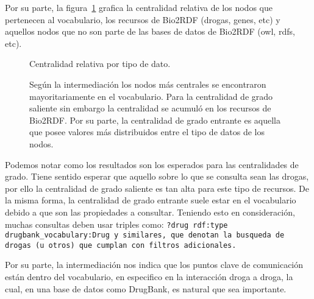 Por su parte, la figura~\ref{fig:comptype} grafica la centralidad relativa de
los nodos que pertenecen al vocabulario, los recursos de Bio2RDF (drogas, genes,
etc) y aquellos nodos que no son parte de las bases de datos de Bio2RDF (owl,
rdfs, etc).
\begin{figure}[h]
  \caption{Centralidad relativa por tipo de dato.}
  \caption*{
    Según la intermediación los nodos más centrales se encontraron
    mayoritariamente en el vocabulario. Para la centralidad de grado
    saliente sin embargo la centralidad se acumuló en los recursos de Bio2RDF.
    Por su parte, la centralidad de grado entrante es aquella que posee valores
    más distribuidos entre el tipo de datos de los nodos.
  }
  \label{fig:comptype}
\end{figure}

Podemos notar como los resultados son los esperados para las centralidades de
grado.
Tiene sentido esperar que aquello sobre lo que se consulta sean las  drogas, por
ello la centralidad de grado saliente es tan alta para este tipo de recursos.
De la misma forma, la centralidad de grado entrante suele estar en el
vocabulario debido a que son las propiedades a consultar.
Teniendo esto en consideración, muchas consultas deben usar triples
como: \tt{?drug rdf:type drugbank\_vocabulary:Drug} y similares, que denotan la
busqueda de drogas (u otros) que cumplan con filtros adicionales.

Por su parte, la intermediación nos indica que los puntos clave de comunicación
están dentro del vocabulario, en especifico en la interacción droga a droga, la
cual, en una base de datos como DrugBank, es natural que sea importante.

